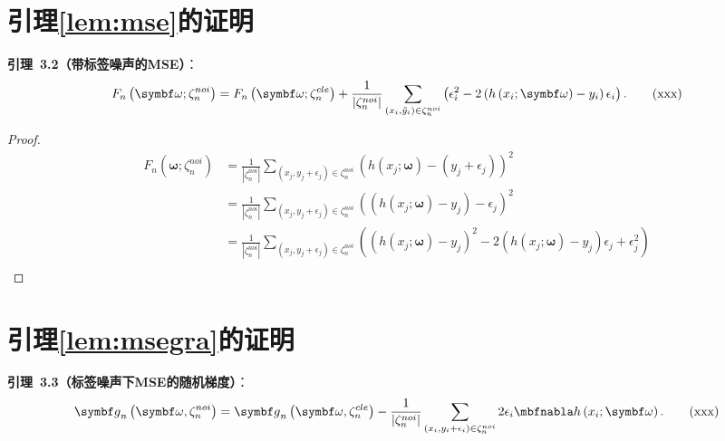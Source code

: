 \section{引理\ref{lem:mse}的证明}\label{app:lemma2}
\noindent \textbf{引理~3.2（带标签噪声的MSE）}：
\begin{multline}
F_n\left(\omegab;\zetanoi_n\right)=F_n\left(\omegab;\zetacle_n\right)
    +\frac{1}{|\zetanoi_n|}\sum_{\left(x_i,\tilde{y}_i\right)\in \zetanoi_n}\left( \epsilon_i^2 - 2\left(h\left(x_i;\omegab\right)-y_i\right)\epsilon_i \right).
\tag{xxx}
\end{multline}
\begin{proof}
\begin{equation}\label{Derivation of noise loss function}
\begin{aligned}
    F_n\left(\boldsymbol{\omega};\zeta_n^{noi}\right)&=\frac{1}{|\zeta_n^{noi}|}\sum_{\left(x_j,y_j+\epsilon_j\right)\in \zeta_n^{noi}}\left(h\left(x_j;\boldsymbol{\omega}\right)-\left(y_j+\epsilon_j\right)\right)^2\\
    &=\frac{1}{|\zeta_n^{noi}|}\sum_{\left(x_j,y_j+\epsilon_j\right)\in \zeta_n^{noi}}\left(\left(h\left(x_j;\boldsymbol{\omega}\right)-y_j\right)-\epsilon_j\right)^2\\
    &=\frac{1}{|\zeta_n^{noi}|}\sum_{\left(x_j,y_j+\epsilon_j\right)\in \zeta_n^{noi}}\left(\left(h\left(x_j;\boldsymbol{\omega}\right)-y_j\right)^2-2\left(h\left(x_j;\boldsymbol{\omega}\right)-y_j\right)\epsilon_j+\epsilon_j^2\right)\\
\end{aligned}
\end{equation}
\end{proof}
\section{引理\ref{lem:msegra}的证明}\label{app:lemma3}
\noindent \textbf{引理~3.3（标签噪声下MSE的随机梯度）}：
    \begin{multline}\label{eq:lemma3}
\gb_n\left(\omegab,\zetanoi_n\right) %
=\gb_n\left(\omegab,\zetacle_n\right)
-\frac{1}{|\zetanoi_n|}\sum_{\left(x_i,y_i+\epsilon_i\right)\in \zetanoi_n}2\epsilon_i \nabla h\left(x_i;\boldsymbol{\omega}\right).
\tag{xxx}
\end{multline}

